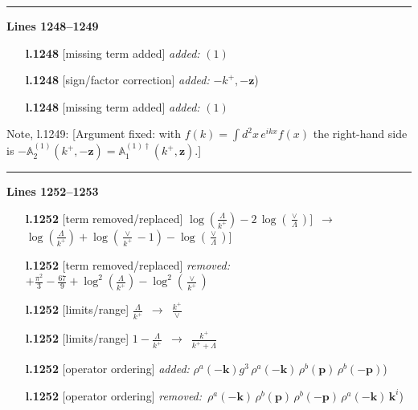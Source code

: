 \documentclass[10pt]{article}
\newenvironment{notebox}{\def\FrameCommand{{\color{notebar}\vrule width 1.5pt}\hspace{6pt}}\MakeFramed{\advance\hsize-\width\FrameRestore}\small}{\endMakeFramed}
\def\mf#1{\mathbb{#1}}
\begin{document}
\noindent\rule{\linewidth}{0.3pt}\par\noindent\textbf{Lines 1248--1249} \par
\begin{itemize}[leftmargin=2.2em,itemsep=1pt,topsep=2pt]
\item[\textbf{l.1248}] \textsf{\small [missing term added]} \emph{added:} $\displaystyle (1)$
\item[\textbf{l.1248}] \textsf{\small [sign/factor correction]} \emph{added:} $\displaystyle -$$\displaystyle k^{+},-\mathbf{z}${\color{gray}\small)}
\item[\textbf{l.1248}] \textsf{\small [missing term added]} \emph{added:} $\displaystyle (1)$
\end{itemize}
\begin{notebox}\textsf{\small Note, l.1249:} [Argument fixed: with $f(k)=\int d^2x\,e^{ikx}f(x)$ the right-hand side is $-\mf{A}^{(1)}_2(k^+,-\mathbf{z})=\mf{A}^{(1)\dagger}_1(k^+,\mathbf{z})$.]\end{notebox}
\noindent\rule{\linewidth}{0.3pt}\par\noindent\textbf{Lines 1252--1253} \par
\begin{itemize}[leftmargin=2.2em,itemsep=1pt,topsep=2pt]
\item[\textbf{l.1252}] \textsf{\small [term removed/replaced]} $\displaystyle \log{(\frac{\Lambda}{k^{+}})}-2\,\log{(\frac{\vee}{\Lambda})}]$\ $\longrightarrow$\ $\displaystyle \log{(\frac{\Lambda}{k^{+}})}+\log{(\frac{\vee}{k^{+}}-1)}-\log{(\frac{\vee}{\Lambda})}]$
\item[\textbf{l.1252}] \textsf{\small [term removed/replaced]} \emph{removed:} $\displaystyle + \frac{\pi^{2}}{3} - \frac{67}{9} +\log^{2}(\frac{\Lambda}{k^{+}})-\log^{2}(\frac{\vee}{k^{+}})$
\item[\textbf{l.1252}] \textsf{\small [limits/range]} $\displaystyle \frac{\Lambda}{k^{+}}$\ $\longrightarrow$\ $\displaystyle \frac{k^{+}}{\vee}$
\item[\textbf{l.1252}] \textsf{\small [limits/range]} $\displaystyle 1-\frac{\Lambda}{k^{+}}$\ $\longrightarrow$\ $\displaystyle \frac{k^{+}}{k^{+}+\Lambda}$
\item[\textbf{l.1252}] \textsf{\small [operator ordering]} \emph{added:} $\displaystyle \rho^{a}(-\mathbf{k})$$\displaystyle g^{3}\,\rho^{a}(-\mathbf{k})\,\rho^{b}(\mathbf{p})\,\rho^{b}(-\mathbf{p})${\color{gray}\small)}
\item[\textbf{l.1252}] \textsf{\small [operator ordering]} \emph{removed:} $\displaystyle \,\rho^{a}(-\mathbf{k})$$\displaystyle \,\rho^{b}(\mathbf{p})\,\rho^{b}(-\mathbf{p})\,\rho^{a}(-\mathbf{k})\, \mathbf{k}^{i}${\color{gray}\small)}
\end{itemize}
\end{document}
